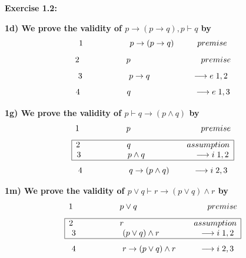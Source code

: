 \documentclass[a4paper]{article}
\begin{document}
\textbf{\large\hspace{0.5cm} Exercise 1.2:}

\textbf{\large\hspace{1cm} 1d) We prove the validity of	$p \rightarrow (p \rightarrow q), p \vdash q$ by}
{\large
$$1 \hspace{2 cm} p \rightarrow (p \rightarrow q) \hspace{1 cm} premise$$ $$2 \hspace{2 cm}  p  \hspace{3 cm} premise$$ $$3 \hspace{2 cm} p\rightarrow q \hspace{1.8 cm} \longrightarrow e\hspace{0.1 cm} 1,2$$ $$4 \hspace{2 cm} q \hspace{2.7 cm} \longrightarrow e\hspace{0.1 cm} 1,3$$}

\textbf{\large\hspace{1cm} 1g) We prove the validity of	$p \vdash q \rightarrow (p \wedge q)$ by}
{\large $$1 \hspace{2 cm} p \hspace{3 cm} premise$$
$$\begin{array}{|c|} 
\hline
\textcolor{black}{2 \hspace{2 cm} q \hspace{2.4 cm} assumption}\\
\textcolor{black}{3 \hspace{2 cm} p \wedge q \hspace{2.1 cm} \longrightarrow i \hspace{0.1 cm} 1,2}\\
\hline
\end{array}$$
$$4 \hspace{2 cm} q \rightarrow (p \wedge q) \hspace{1 cm} \longrightarrow i\hspace{0.1 cm} 2,3$$}

\textbf{\large\hspace{1cm} 1m) We prove the validity of	$p \vee q \vdash r \rightarrow (p \vee q) \wedge r$ by}
{\large$$1 \hspace{2 cm} p \vee q \hspace{3 cm} premise$$
$$\begin{array}{|c|} 
\hline
\textcolor{black}{2 \hspace{2 cm} r \hspace{3 cm} assumption}\\
\textcolor{black}{3 \hspace{2 cm} (p \vee q) \wedge r \hspace{1.7 cm} \longrightarrow i \hspace{0.1 cm} 1,2}\\
\hline
\end{array}$$
$$4 \hspace{2 cm} r \rightarrow (p \vee q) \wedge r \hspace{1 cm} \longrightarrow i\hspace{0.1 cm} 2,3$$}
\end{document}
